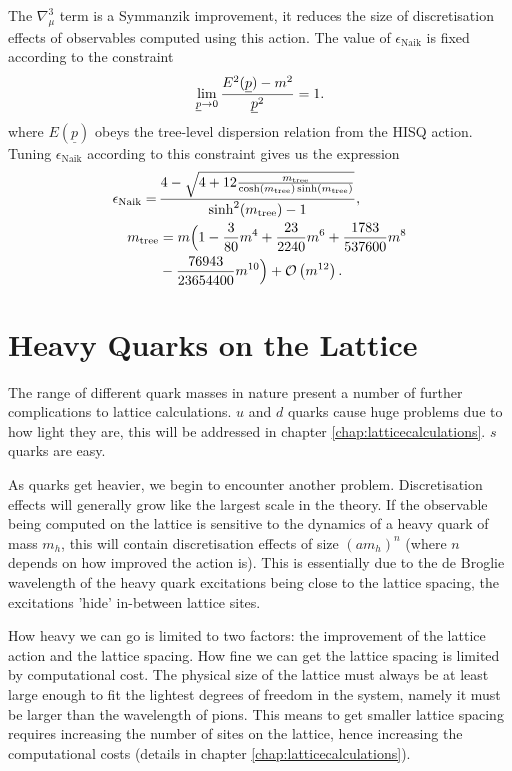 The $\nabla^3_{\mu}$ term is a Symmanzik improvement, it reduces the size of discretisation effects of observables computed using this action. The value of $\epsilon_{\text{Naik}}$ is fixed according to the constraint
\begin{align}
	\lim_{\underline{p}\to 0} {E^2(\underline{p})-m^2\over \underline{p}^2} = 1.
\end{align}
where $E(\underline{p})$ obeys the tree-level dispersion relation from the HISQ action. Tuning $\epsilon_{\text{Naik}}$ according to this constraint gives us the expression
\begin{align}
  \epsilon_{\text{Naik}} = \,&{ 4 - \sqrt{ 4 + 12 {m_{\text{tree}}\over \cosh(m_{\text{tree}}) \sinh(m_{\text{tree}})} } \over \sinh^2(m_{\text{tree}}) - 1 }, \\
  \nonumber
  m_{\text{tree}} &= m\Big( 1 - {3\over 80}m^4 + {23\over 2240}m^6 + {1783\over 537600 }m^8 \\ &- {76943\over 23654400} m^{10} \Big) + \mathcal{O}\left( m^{12} \right). \nonumber
\end{align}

\section{Heavy Quarks on the Lattice}

The range of different quark masses in nature present a number of further complications to lattice calculations. $u$ and $d$ quarks cause huge problems due to how light they are, this will be addressed in chapter \ref{chap:latticecalculations}. $s$ quarks are easy.

As quarks get heavier, we begin to encounter another problem. Discretisation effects will generally grow like the largest scale in the theory. If the observable being computed on the lattice is sensitive to the dynamics of a heavy quark of mass $m_h$, this will contain discretisation effects of size $(am_h)^n$ (where $n$ depends on how improved the action is). This is essentially due to the de Broglie wavelength of the heavy quark excitations being close to the lattice spacing, the excitations 'hide' in-between lattice sites.

How heavy we can go is limited to two factors: the improvement of the lattice action and the lattice spacing. How fine we can get the lattice spacing is limited by computational cost. The physical size of the lattice must always be at least large enough to fit the lightest degrees of freedom in the system, namely it must be larger than the wavelength of pions. This means to get smaller lattice spacing requires increasing the number of sites on the lattice, hence increasing the computational costs (details in chapter \ref{chap:latticecalculations}).

